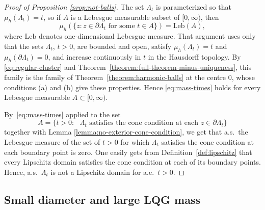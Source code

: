 \documentclass[12pt]{amsart}
\numberwithin{equation}{section}
\newcommand{\regcluster}[2]{\hyperref[eq:regular-cluster]{\Lambda^{#1}_{#2}}}
\begin{document}
	\begin{proof}[Proof of Proposition \ref{prop:not-balls}]
		The set ${\regcluster{}{t}}$ is parameterized so that $\mu_h({\regcluster{}{t}})  = t$, so if $A$ is a Lebesgue measurable subset of $[0, \infty)$, then
		\begin{equation}\label{eq:mass-times}
		\mu_h(\{z : z \in \partial {\regcluster{}{t}} \mbox{ for some $t \in A$}\}) = \mbox{Leb}(A) ,
		\end{equation} 
		where $\mbox{Leb}$ denotes one-dimensional Lebesgue measure.
		That argument uses only that the sets $\regcluster{}{t}$, $t > 0$, are bounded and open, satisfy $\mu_h(\regcluster{}{t}) = t$ and $\mu_h(\partial\regcluster{}{t}) = 0$, and increase continuously in $t$ in the Hausdorff topology. By \eqref{eq:regular-cluster} and Theorem~\ref{theorem:full-theorem-minus-uniqueness}, this family is the family of Theorem~\ref{theorem:harmonic-balls} at the centre $0$, whose conditions (a) and (b) give these properties. Hence \eqref{eq:mass-times} holds for every Lebesgue measurable $A \subset [0,\infty)$. 
		
		
		By~\eqref{eq:mass-times} applied to the set 
		\[
		A = \{t > 0 : \mbox{ ${\regcluster{}{t}}$ satisfies the cone condition at each $z\in \partial {\regcluster{}{t}}$}\}
		\]
		together with Lemma \ref{lemma:no-exterior-cone-condition}, we get that a.s.\ the Lebesgue measure of the set of $t>0$ for which ${\regcluster{}{t}}$ satisfies the cone condition at each boundary point is zero. One easily gets from Definition~\ref{def:lipschitz} that every Lipschitz domain satisfies the cone condition at each of its boundary points. Hence, a.s.\ ${\regcluster{}{t}}$ is not a Lipschitz domain for a.e.\ $t>0$.
	\end{proof}
	
	\subsection{Small diameter and large LQG mass} \label{subsec:small-diamter-large-lqg-mass}
	
\end{document}
